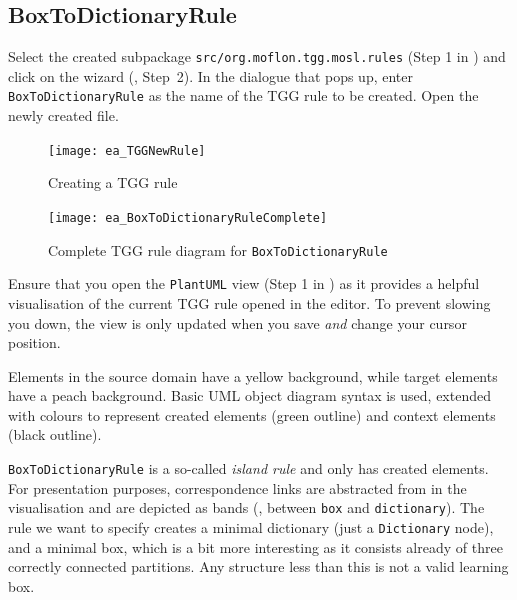 \newpage
\hypertarget{rules vis}{}
\subsection{BoxToDictionaryRule}
\genHeader

\begin{stepbystep}

\item Select the created subpackage \texttt{src/org.moflon.tgg.mosl.rules} (Step 1 in ) and click on the wizard  (\eMoflonCreateTGGRuleIcon, Step~2).
In the dialogue that pops up, enter \texttt{BoxToDictionaryRule} as the name of the TGG rule to be created.
Open the newly created file.

\begin{figure}[htbp]
\begin{center}
  \texttt{[image: ea\_TGGNewRule]}
  \caption{Creating a TGG rule}
  \label{ea:create_tgg_rule}
\end{center}
\end{figure}

\begin{figure}[htbp]
\begin{center}
  \texttt{[image: ea\_BoxToDictionaryRuleComplete]}
  \caption{Complete TGG rule diagram for \texttt{BoxToDictionaryRule}}
  \label{ea:boxtodictionaryrule_complete}
  \end{center}
\end{figure}

\item  Ensure that you open the \texttt{PlantUML} view (Step 1 in ) as it provides a helpful visualisation of the current TGG rule opened in the editor.
To prevent slowing you down, the view is only updated when you save \emph{and} change your cursor position.

Elements in the source domain have a yellow background, while target elements have a peach background.
Basic UML object diagram syntax is used, extended with colours to represent created elements (green outline) and context elements (black outline).

\texttt{BoxToDictionaryRule} is a so-called \emph{island rule} and only has created elements.
For presentation purposes, correspondence links are abstracted from in the visualisation and are depicted as bands (\eg, between \texttt{box} and \texttt{dictionary}).
The rule we want to specify creates a minimal dictionary (just a \texttt{Dictionary} node), and a minimal box, which is a bit more interesting as it consists already of three correctly connected partitions.
Any structure less than this is not a valid learning box.


\end{stepbystep}
